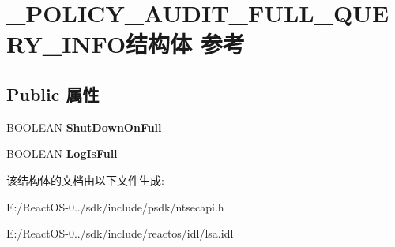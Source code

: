 \hypertarget{struct___p_o_l_i_c_y___a_u_d_i_t___f_u_l_l___q_u_e_r_y___i_n_f_o}{}\section{\+\_\+\+P\+O\+L\+I\+C\+Y\+\_\+\+A\+U\+D\+I\+T\+\_\+\+F\+U\+L\+L\+\_\+\+Q\+U\+E\+R\+Y\+\_\+\+I\+N\+F\+O结构体 参考}
\label{struct___p_o_l_i_c_y___a_u_d_i_t___f_u_l_l___q_u_e_r_y___i_n_f_o}
\subsection*{Public 属性}
\begin{DoxyCompactItemize}
\item 
\mbox{\label{struct___p_o_l_i_c_y___a_u_d_i_t___f_u_l_l___q_u_e_r_y___i_n_f_o_a05e4b8b105138950a8c13118ed438c4f}} 
\hyperlink{_processor_bind_8h_a112e3146cb38b6ee95e64d85842e380a}{B\+O\+O\+L\+E\+AN} {\bfseries Shut\+Down\+On\+Full}
\item 
\mbox{\label{struct___p_o_l_i_c_y___a_u_d_i_t___f_u_l_l___q_u_e_r_y___i_n_f_o_a98bf53d1146808f84446550afae47516}} 
\hyperlink{_processor_bind_8h_a112e3146cb38b6ee95e64d85842e380a}{B\+O\+O\+L\+E\+AN} {\bfseries Log\+Is\+Full}
\end{DoxyCompactItemize}


该结构体的文档由以下文件生成\+:\begin{DoxyCompactItemize}
\item 
E\+:/\+React\+O\+S-\/0../sdk/include/psdk/ntsecapi.\+h\item 
E\+:/\+React\+O\+S-\/0../sdk/include/reactos/idl/lsa.\+idl\end{DoxyCompactItemize}
